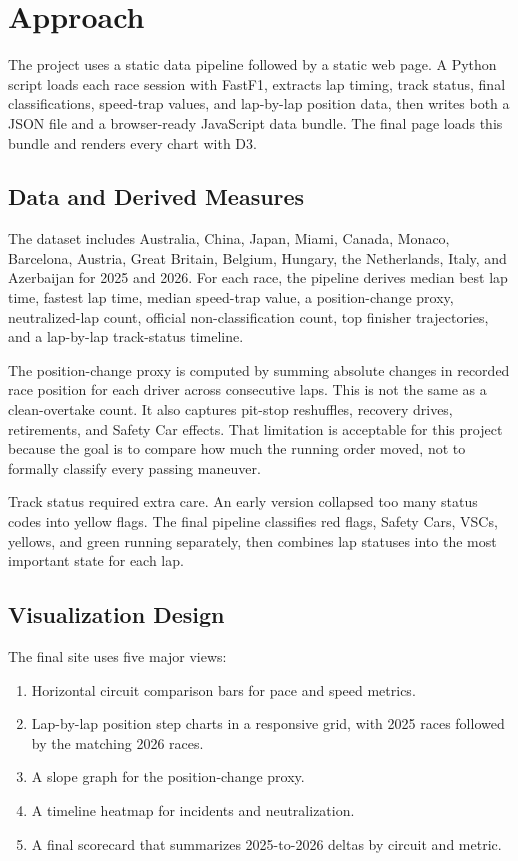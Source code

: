 \documentclass[conference]{IEEEtran}
\begin{document}
\section{Approach}
The project uses a static data pipeline followed by a static web page. A Python script loads each race session with FastF1, extracts lap timing, track status, final classifications, speed-trap values, and lap-by-lap position data, then writes both a JSON file and a browser-ready JavaScript data bundle. The final page loads this bundle and renders every chart with D3.

\subsection{Data and Derived Measures}
The dataset includes Australia, China, Japan, Miami, Canada, Monaco, Barcelona, Austria, Great Britain, Belgium, Hungary, the Netherlands, Italy, and Azerbaijan for 2025 and 2026. For each race, the pipeline derives median best lap time, fastest lap time, median speed-trap value, a position-change proxy, neutralized-lap count, official non-classification count, top finisher trajectories, and a lap-by-lap track-status timeline.

The position-change proxy is computed by summing absolute changes in recorded race position for each driver across consecutive laps. This is not the same as a clean-overtake count. It also captures pit-stop reshuffles, recovery drives, retirements, and Safety Car effects. That limitation is acceptable for this project because the goal is to compare how much the running order moved, not to formally classify every passing maneuver.

Track status required extra care. An early version collapsed too many status codes into yellow flags. The final pipeline classifies red flags, Safety Cars, VSCs, yellows, and green running separately, then combines lap statuses into the most important state for each lap.

\subsection{Visualization Design}
The final site uses five major views:
\begin{enumerate}
    \item Horizontal circuit comparison bars for pace and speed metrics.
    \item Lap-by-lap position step charts in a responsive grid, with 2025 races followed by the matching 2026 races.
    \item A slope graph for the position-change proxy.
    \item A timeline heatmap for incidents and neutralization.
    \item A final scorecard that summarizes 2025-to-2026 deltas by circuit and metric.
\end{enumerate}
\end{document}

